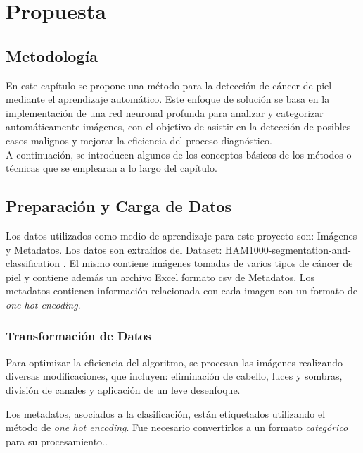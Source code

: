 \chapter{Propuesta}\label{chapter:proposal}

\section{Metodología}\label{sec:method}
 En este capítulo se propone una método para la detección de cáncer de piel mediante el aprendizaje automático. Este enfoque de solución se basa
en la implementación de una  red neuronal profunda para analizar y categorizar automáticamente imágenes, con el objetivo de asistir 
en la detección de posibles casos malignos y mejorar la eficiencia del proceso diagnóstico. \\

A continuación, se introducen algunos de los conceptos básicos de los métodos o técnicas que se emplearan a lo largo del capítulo.

\section{Preparación y Carga de Datos}

 Los datos utilizados como medio de aprendizaje para este proyecto son: Imágenes y Metadatos. Los datos son extraídos del Dataset: HAM1000-segmentation-and-classification  \cite{ham10000}.
 El mismo contiene imágenes tomadas de varios tipos de cáncer de piel y contiene además un archivo Excel formato csv de Metadatos. Los metadatos contienen información relacionada con 
 cada imagen con un formato de \textit{one hot encoding}.

\subsection{Transformación de Datos}

Para optimizar la eficiencia del algoritmo, se procesan las imágenes realizando diversas modificaciones, que incluyen: 
eliminación de cabello, luces y sombras, división de canales y aplicación de un leve desenfoque.

Los metadatos, asociados a la clasificación, están etiquetados utilizando el método de \textit{one hot encoding}. 
Fue necesario convertirlos a un formato \textit{categórico} para su procesamiento..


